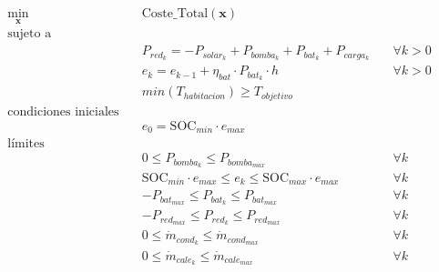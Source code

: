 \begin{align}
	\min_{\mathbf{x}} \quad & \text{Coste\_Total}(\mathbf{x})                                                                                                            \\
	\text{sujeto a} \quad   & \nonumber                                                                                                                                  \\
	                        & P_{red_k} = -P_{solar_k} + P_{bomba_k} + P_{bat_k} + P_{carga_k} \quad                                                     & \forall k > 0 \\
	                        & e_k = e_{k-1} + \eta_{bat} \cdot P_{bat_k} \cdot h \quad                                                                   & \forall k > 0 \\
	                        & min(T_{habitacion}) \geq T_{objetivo}                                               \label{eq:min_t_habitacion_constraint}                 \\
	\text{condiciones iniciales} \quad \nonumber                                                                                                                         \\
	                        & e_0 = \text{SOC}_{min} \cdot e_{max}                                                                                                       \\
	\text{límites} \quad    & \nonumber                                                                                                                                  \\
	                        & 0 \leq P_{bomba_k} \leq P_{bomba_{max}} \quad                                                                              & \forall k     \\
	                        & \text{SOC}_{min} \cdot e_{max} \leq e_k \leq \text{SOC}_{max} \cdot e_{max} \quad                                          & \forall k     \\
	                        & -P_{bat_{max}} \leq P_{bat_k} \leq P_{bat_{max}} \quad                                                                     & \forall k     \\
	                        & -P_{red_{max}} \leq P_{red_k} \leq P_{red_{max}} \quad                                                                     & \forall k     \\
	                        & 0 \leq \dot{m}_{cond_k} \leq \dot{m}_{cond_{max}} \quad                                                                    & \forall k     \\
	                        & 0 \leq \dot{m}_{cale_k} \leq \dot{m}_{cale_{max}} \quad                                                                    & \forall k
\end{align}


